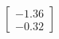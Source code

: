 \documentclass[preview]{standalone}
\begin{document}
\begin{align*}
\begin{bmatrix} -1.36 \\ -0.32 \end{bmatrix}
\end{align*}
\end{document}
